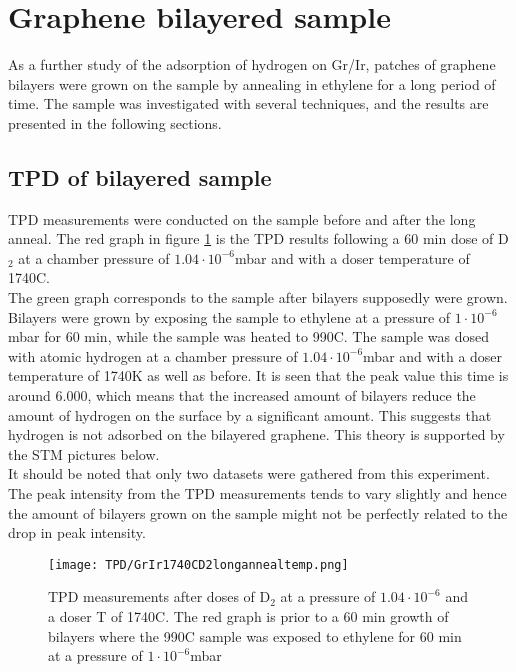 \section{Graphene bilayered sample}

As a further study of the adsorption of hydrogen on Gr/Ir, patches of graphene bilayers were grown on the sample by annealing in ethylene for a long period of time. The sample was investigated with several techniques, and the results are presented in the following sections.

\subsection{TPD of bilayered sample}
TPD measurements were conducted on the sample before and after the long anneal. The red graph in figure \ref{TPD:bilayer} is the TPD results following a 60 min dose of D$_2$ at a chamber pressure of $1.04\cdot10^{-6}$mbar and with a doser temperature of 1740\degree C. \\
The green graph corresponds to the sample after bilayers supposedly were grown. Bilayers were grown by exposing the sample to ethylene at a pressure of $1\cdot 10^{-6}$mbar for 60 min, while the sample was heated to 990\degree C. The sample was dosed with atomic hydrogen at a chamber pressure of $1.04\cdot 10^{-6}$mbar and with a doser temperature of 1740K as well as before. It is seen that the peak value this time is around 6.000, which means that the increased amount of bilayers reduce the amount of hydrogen on the surface by a significant amount. This suggests that hydrogen is not adsorbed on the bilayered graphene. This theory is supported by the STM pictures below.\\
It should be noted that only two datasets were gathered from this experiment. The peak intensity from the TPD measurements tends to vary slightly and hence the amount of bilayers grown on the sample might not be perfectly related to the drop in peak intensity.
\begin{figure}[H]
  \centering
  \texttt{[image: TPD/GrIr1740CD2longannealtemp.png]}
  \caption{TPD measurements after doses of D$_2$ at a pressure of $1.04\cdot10^{-6}$ and a doser T of 1740\degree C. The red graph is prior to a 60 min growth of bilayers where the 990\degree C sample was exposed to ethylene for 60 min at a pressure of $1\cdot10^{-6}$mbar}
  \label{TPD:bilayer}
\end{figure}



